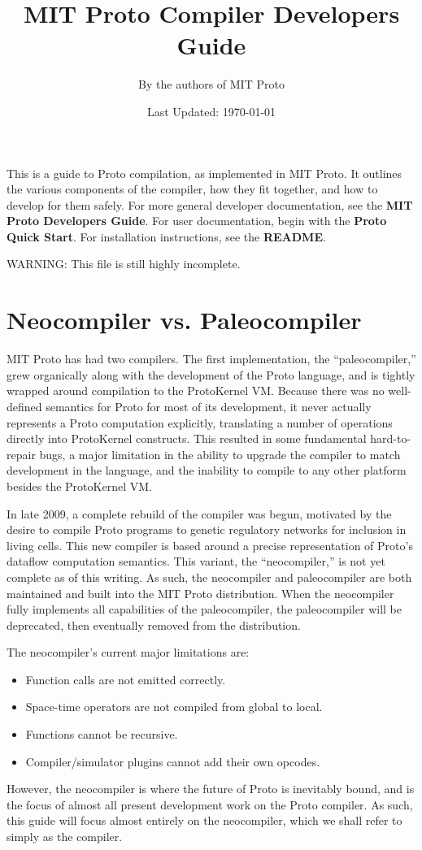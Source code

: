 \documentclass{article}
\title{MIT Proto Compiler Developers Guide}
\author{By the authors of MIT Proto}
\date{Last Updated: \today}
\begin{document}
\maketitle

This is a guide to Proto compilation, as implemented in MIT Proto. It outlines
the various components of the compiler, how they fit together, and how to
develop for them safely.  For more general developer documentation, see the {\bf
MIT Proto Developers Guide}.  For user documentation, begin with the {\bf Proto
Quick Start}. For installation instructions, see the {\bf README}.

WARNING: This file is still highly incomplete.

\tableofcontents



\section{Neocompiler vs. Paleocompiler}

MIT Proto has had two compilers.  The first implementation, the
``paleocompiler,'' grew organically along with the development of the Proto
language, and is tightly wrapped around compilation to the ProtoKernel VM.
Because there was no well-defined semantics for Proto for most of its
development, it never actually represents a Proto computation explicitly,
translating a number of operations directly into ProtoKernel constructs.  This
resulted in some fundamental hard-to-repair bugs, a major limitation in the
ability to upgrade the compiler to match development in the language, and the
inability to compile to any other platform besides the ProtoKernel VM.

In late 2009, a complete rebuild of the compiler was begun, motivated by the
desire to compile Proto programs to genetic regulatory networks for inclusion in
living cells.  This new compiler is based around a precise representation of
Proto's dataflow computation semantics. This variant, the ``neocompiler,'' is
not yet complete as of this writing.  As such, the neocompiler and paleocompiler
are both maintained and built into the MIT Proto distribution.  When the
neocompiler fully implements all capabilities of the paleocompiler, the
paleocompiler will be deprecated, then eventually removed from the distribution.

The neocompiler's current major limitations are:
\begin{itemize}
  \item Function calls are not emitted correctly.
  \item Space-time operators are not compiled from global to local.
  \item Functions cannot be recursive.
  \item Compiler/simulator plugins cannot add their own opcodes.
\end{itemize}
However, the neocompiler is where the future of Proto is inevitably bound, and
is the focus of almost all present development work on the Proto compiler.  As
such, this guide will focus almost entirely on the neocompiler, which we shall
refer to simply as the compiler.
\end{document}
